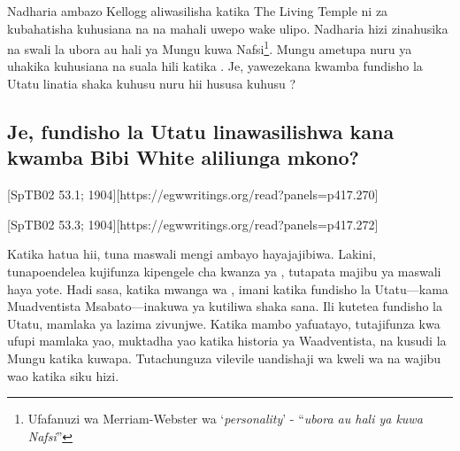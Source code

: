 Nadharia ambazo Kellogg aliwasilisha katika The Living Temple ni za kubahatisha kuhusiana na  na mahali uwepo wake ulipo. Nadharia hizi zinahusika na swali la ubora au hali ya Mungu kuwa Nafsi\footnote{Ufafanuzi wa Merriam-Webster wa ‘\textit{personality}’ - “\textit{ubora au hali ya kuwa Nafsi}”}. Mungu ametupa nuru ya uhakika kuhusiana na suala hili katika . Je, yawezekana kwamba fundisho la Utatu linatia shaka kuhusu nuru hii hususa kuhusu ?

\subsection*{Je, fundisho la Utatu linawasilishwa kana kwamba Bibi White aliliunga mkono?}

[SpTB02 53.1; 1904][https://egwwritings.org/read?panels=p417.270]

[SpTB02 53.3; 1904][https://egwwritings.org/read?panels=p417.272]

Katika hatua hii, tuna maswali mengi ambayo hayajajibiwa. Lakini, tunapoendelea kujifunza kipengele cha kwanza ya , tutapata majibu ya maswali haya yote. Hadi sasa, katika mwanga wa , imani katika fundisho la Utatu—kama Muadventista Msabato—inakuwa ya kutiliwa shaka sana. Ili kutetea fundisho la Utatu, mamlaka ya  lazima zivunjwe. Katika mambo yafuatayo, tutajifunza kwa ufupi mamlaka yao, muktadha yao katika historia ya Waadventista, na kusudi la Mungu katika kuwapa. Tutachunguza vilevile uandishaji wa kweli wa  na wajibu wao katika siku hizi.


